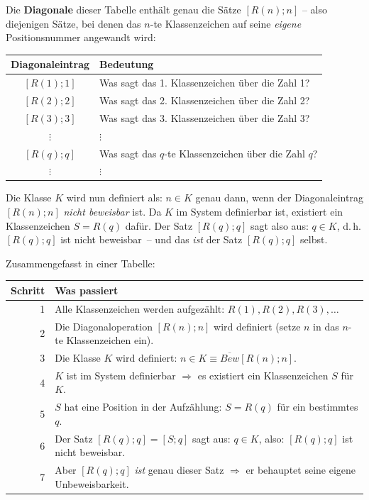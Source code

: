 Die \textbf{Diagonale} dieser Tabelle enthält genau die Sätze $[R(n); n]$ -- also
diejenigen Sätze, bei denen das $n$-te Klassenzeichen auf seine \textit{eigene}
Positionsnummer angewandt wird:

\begin{center}
\begin{tabular}{cl}
	\textbf{Diagonaleintrag} & \textbf{Bedeutung} \\
	\hline
	$[R(1); 1]$ & Was sagt das 1. Klassenzeichen über die Zahl 1? \\
	$[R(2); 2]$ & Was sagt das 2. Klassenzeichen über die Zahl 2? \\
	$[R(3); 3]$ & Was sagt das 3. Klassenzeichen über die Zahl 3? \\
	$\vdots$ & $\vdots$ \\
	$[R(q); q]$ & Was sagt das $q$-te Klassenzeichen über die Zahl $q$? \\
	$\vdots$ & $\vdots$ \\
\end{tabular}
\end{center}

Die Klasse $K$ wird nun definiert als: $n \in K$ genau dann, wenn der
Diagonaleintrag $[R(n); n]$ \textit{nicht beweisbar} ist. Da $K$ im System
definierbar ist, existiert ein Klassenzeichen $S = R(q)$ dafür. Der Satz
$[R(q); q]$ sagt also aus: \frq $q \in K$\flq, d.\,h. \frq $[R(q); q]$ ist
nicht beweisbar\flq\ -- und das \textit{ist} der Satz $[R(q); q]$ selbst.

Zusammengefasst in einer Tabelle:

\begin{center}
\begin{tabular}{rp{10cm}}
	\textbf{Schritt} & \textbf{Was passiert} \\
	\hline
	1 & Alle Klassenzeichen werden aufgezählt: $R(1), R(2), R(3), \dots$ \\
	2 & Die Diagonaloperation $[R(n); n]$ wird definiert (setze $n$ in das $n$-te Klassenzeichen ein). \\
	3 & Die Klasse $K$ wird definiert: $n \in K \equiv \overline{Bew}[R(n); n]$. \\
	4 & $K$ ist im System definierbar $\Longrightarrow$ es existiert ein Klassenzeichen $S$ für $K$. \\
	5 & $S$ hat eine Position in der Aufzählung: $S = R(q)$ für ein bestimmtes $q$. \\
	6 & Der Satz $[R(q); q] = [S; q]$ sagt aus: \frq $q \in K$\flq, also: \frq $[R(q); q]$ ist nicht beweisbar\flq. \\
	7 & Aber $[R(q); q]$ \textit{ist} genau dieser Satz $\Longrightarrow$ er behauptet seine eigene Unbeweisbarkeit. \\
\end{tabular}
\end{center}

